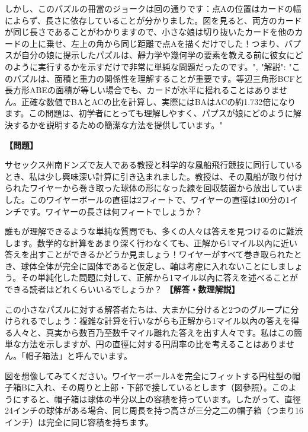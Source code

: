 \documentclass[10pt,a4paper,oneside,openany]{ltjsbook}
\begin{document}
\begin{tcolorbox}[colback=softblue,colframe=primaryblue,title=\textbf{第 199 問：PAPA'S PUZZLE.},arc=2mm,boxrule=1pt,breakable]
{しかし、このパズルの冊當のジョークは回の通りです：点Aの位置はカードの幅によらず、長さに依存していることが分かりました。図を見ると、両方のカードが同じ長さであることがわかりますので、小さな娘は切り抜いたカードを他のカードの上に乗せ、左上の角から同じ距離で点Aを描くだけでした！つまり、パプスが自分の娘に提示したパズルは、靜力学や幾何学の要素を教える前に彼女にどのように実行するかを示すだけで非常に単純な問題だったのです。",
  "解説": "このパズルは、面積と重力の関係性を理解することが重要です。等辺三角形BCFと長方形ABEの面積が等しい場合でも、カードが水平に揺れることはありません。正確な数値でBAとACの比を計算し、実際にはBAはACの約1.732倍になります。この問題は、初学者にとっても理解しやすく、パプスが娘にどのように解決するかを説明するための簡潔な方法を提供しています。"
}
\end{tcolorbox}

\begin{tcolorbox}[colback=softblue,colframe=primaryblue,title=\textbf{第 200 問：風船型のワイヤーの長さを求めるパズル （原題: A KITE-FLYING PUZZLE.）},arc=2mm,boxrule=1pt,breakable]
\textbf{【問題】}\par\vspace{0.3em}
サセックス州南ドンズで友人である教授と科学的な風船飛行競技に同行しているとき、私は少し興味深い計算に引き込まれました。教授は、その風船が取り付けられたワイヤーから巻き取った球体の形になった線を回収裝置から放出していました。このワイヤーボールの直徑は2フィートで、ワイヤーの直徑は100分の1インチです。ワイヤーの長さは何フィートでしょうか？

誰もが理解できるような単純な質問でも、多くの人々は答えを見つけるのに難渋します。数学的な計算をあまり深く行わなくても、正解から1マイル以內に近い答えを出すことができるかどうか見ましょう！ワイヤーがすべて巻き取られたとき、球体全体が完全に固体であると仮定し、軸は考慮に入れないことにしましょう。その単純化した問題に対して、正解から1マイル以內に答えを述べることができる読者はどれくらいいるでしょうか？
\tcblower
\textbf{【解答・数理解説】}\par\vspace{0.3em}
この小さなパズルに対する解答者たちは、大まかに分けると2つのグループに分けられるでしょう：複雑な計算を行いながらも正解から1マイル以內の答えを得る人々と、真実から数百乃至数千マイル離れた答えを出す人々です。私はこの簡単な方法を示しますが、円の直徑に対する円周率の比を考えることはありません。「帽子箱法」と呼んでいます。

図を想像してみてください。ワイヤーボールAを完全にフィットする円柱型の帽子箱Bに入れ、その周りと上部・下部で接しているとします（図參照）。このようにすると、帽子箱は球体の半分以上の容積を持っています。したがって、直徑24インチの球体がある場合、同じ周長を持つ高さが三分之二の帽子箱（つまり16インチ）は完全に同じ容積を持ちます。


\end{tcolorbox}
\end{document}

